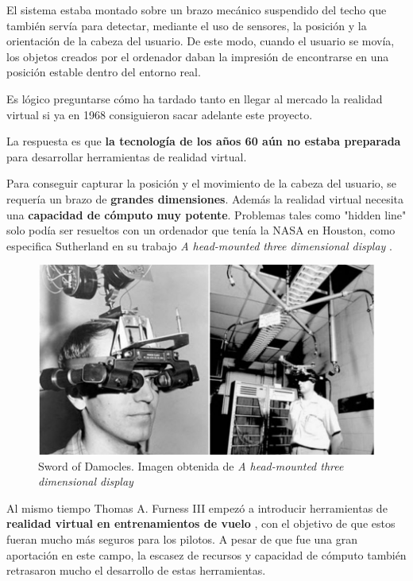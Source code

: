 \documentclass[twoside, 12pt]{epstfg}
\begin{document}
 El sistema estaba montado sobre un brazo mecánico suspendido del techo que también servía para detectar, mediante el uso de sensores, la posición y la orientación de la cabeza del usuario. De este modo, cuando el usuario se movía, los objetos creados por el ordenador daban la impresión de encontrarse en una posición estable dentro del entorno real.

Es lógico preguntarse cómo ha tardado tanto en llegar al mercado la realidad virtual si ya en 1968 consiguieron sacar adelante este proyecto.

La respuesta es que \textbf{la tecnología de los años 60 aún no estaba preparada} para desarrollar herramientas de realidad virtual.

Para conseguir capturar la posición y el movimiento de la cabeza del usuario, se requería un brazo de \textbf{grandes dimensiones}.
Además la realidad virtual necesita una \textbf{capacidad de cómputo muy potente}. Problemas tales como "hidden line" solo podía ser resueltos con un ordenador que tenía la NASA en Houston, como especifica Sutherland en su trabajo \textit{A head-mounted three dimensional display} \cite{Sutherland}. 

\begin{figure}[h]
	\centerline{
		\mbox{\includegraphics[width=.80\textwidth]{images/SwordOfDamocles.jpg}}
	}
	\caption{Sword of Damocles. Imagen obtenida de \textit{A head-mounted three dimensional display} \cite{Sutherland}}
	
\end{figure}


Al mismo tiempo Thomas A. Furness III empezó a introducir herramientas de \textbf{realidad virtual en entrenamientos de vuelo} \cite{kocian1977visually}, con el objetivo de que estos fueran mucho más seguros para los pilotos.
A pesar de que fue una gran aportación en este campo, la escasez de recursos y capacidad de cómputo también retrasaron mucho el desarrollo de estas herramientas.
 
\end{document}
